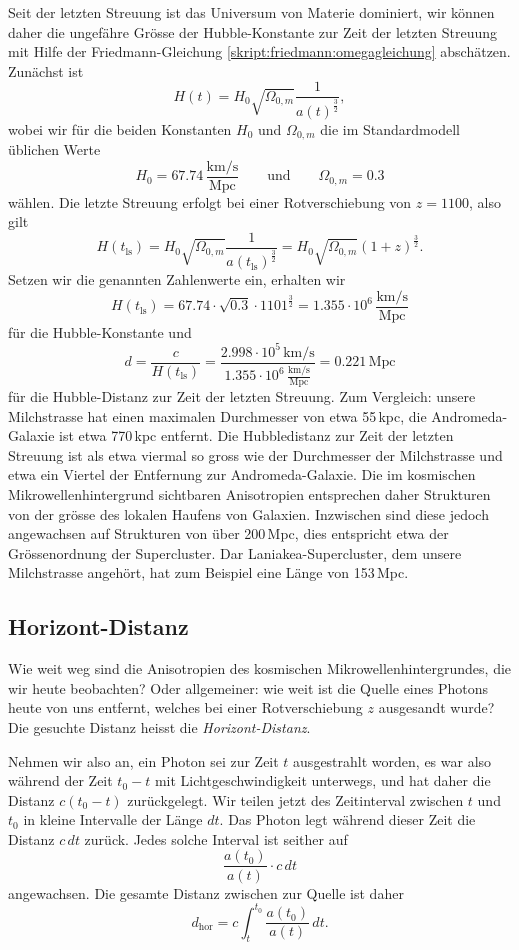 Seit der letzten Streuung ist das Universum von Materie dominiert,
wir können daher die ungefähre Grösse der Hubble-Konstante zur
Zeit der letzten Streuung mit Hilfe der
Friedmann-Gleichung \eqref{skript:friedmann:omegagleichung}
abschätzen.
Zunächst ist
\[
H(t) = H_0\sqrt{\Omega_{0,m}}\frac{1}{a(t)^\frac32},
\]
wobei wir für die beiden Konstanten $H_0$ und $\Omega_{0,m}$ die
im Standardmodell üblichen Werte
\[
H_0
=
67.74\,\frac{\text{km/s}}{\text{Mpc}}
\qquad\text{und}\qquad
\Omega_{0,m}=0.3
\]
wählen.
Die letzte Streuung erfolgt bei einer Rotverschiebung von $z=1100$, also
gilt
\[
H(t_{\text{ls}})
=
H_0\sqrt{\Omega_{0,m}}\frac{1}{a(t_{\text{ls}})^\frac32}
=
H_0\sqrt{\Omega_{0,m}}(1+z)^\frac32.
\]
Setzen wir die genannten Zahlenwerte ein, erhalten wir
\[
H(t_{\text{ls}})
=
67.74\cdot \sqrt{0.3}\cdot 1101^\frac32
=
1.355\cdot 10^{6}\,\frac{\text{km/s}}{\text{Mpc}}
\]
für die Hubble-Konstante und 
\[
d
=
\frac{c}{H(t_{\text{ls}})}
=
\frac{2.998\cdot 10^{5}\,\text{km/s}}%
{1.355\cdot 10^{6}\,\frac{\text{km/s}}{\text{Mpc}}}
=
0.221\,\text{Mpc}
\]
für die Hubble-Distanz zur Zeit der letzten Streuung.
Zum Vergleich: unsere Milchstrasse hat einen maximalen Durchmesser
von etwa 55\,kpc, die Andromeda-Galaxie ist etwa 770\,kpc entfernt.
%
Die Hubbledistanz zur Zeit der letzten Streuung ist als etwa viermal
so gross wie der Durchmesser der Milchstrasse und etwa ein Viertel der
Entfernung zur Andromeda-Galaxie.
Die im kosmischen Mikrowellenhintergrund sichtbaren Anisotropien
entsprechen daher Strukturen von der grösse des lokalen Haufens von
Galaxien.
%
Inzwischen sind diese jedoch angewachsen auf Strukturen von über 200\,Mpc,
dies entspricht etwa der Grössenordnung der Supercluster.
Dar Laniakea-Supercluster, dem unsere Milchstrasse angehört, hat zum Beispiel
eine Länge von 153\,Mpc.
%
%

\subsection{Horizont-Distanz}
Wie weit weg sind die Anisotropien des kosmischen Mikrowellenhintergrundes,
die wir heute beobachten?
Oder allgemeiner: wie weit ist die Quelle eines Photons heute von uns
entfernt, welches bei einer Rotverschiebung $z$ ausgesandt wurde?
Die gesuchte Distanz heisst die {\em Horizont-Distanz}.
%

Nehmen wir also an, ein Photon sei zur Zeit $t$ ausgestrahlt worden,
es war also während der Zeit $t_0-t$ mit Lichtgeschwindigkeit unterwegs,
und hat daher die Distanz $c(t_0-t)$ zurückgelegt.
Wir teilen jetzt des Zeitinterval zwischen $t$ und $t_0$ in kleine
Intervalle der Länge $dt$.
Das Photon legt während dieser Zeit die Distanz $c\,dt$ zurück.
Jedes solche Interval ist seither auf
\[
\frac{a(t_0)}{a(t)}\cdot c \,dt
\]
angewachsen.
Die gesamte Distanz zwischen zur Quelle ist daher
\begin{equation}
d_\text{hor} = c \int_t^{t_0} \frac{a(t_0)}{a(t)}\,dt.
\label{skript:cmb:horizontallg}
\end{equation}

